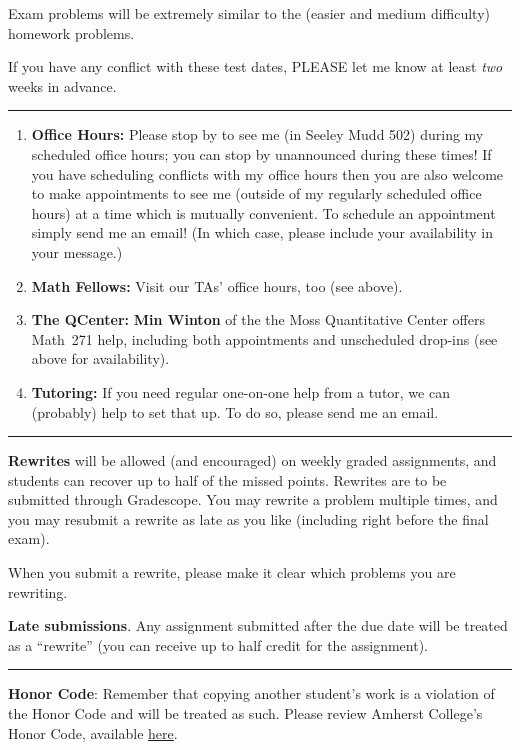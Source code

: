 \documentclass[12pt]{article}
\begin{document}
\noindent Exam problems will be extremely similar to the (easier and medium difficulty) homework problems.
\smallskip

\noindent If you have any conflict with these test dates, PLEASE let me know at least \emph{two} weeks in advance.

\medskip \hrule \medskip

\begin{enumerate}
\item[]{\bf Office Hours:}
 Please stop by to see me (in Seeley Mudd 502) during my scheduled office hours; you can stop by unannounced during these times! If you have scheduling conflicts with my office hours then you are also welcome to make appointments to see me (outside of my regularly scheduled office hours) at a time which is mutually convenient. To schedule an appointment simply send me an email! (In which case, please include your availability in your message.)

\item[] {\bf Math Fellows:} Visit our TAs' office hours, too (see above).
\item[] {\bf The QCenter:} \textbf{Min Winton} of the the Moss Quantitative Center offers Math~271 help, including both appointments and unscheduled drop-ins (see above for availability).
\item[] {\bf Tutoring:} If you need regular one-on-one help from a tutor, we can (probably) help to set that up. To do so, please send me an email.
\end{enumerate}

\medskip \hrule \medskip

\noindent\textbf{Rewrites} will be allowed (and encouraged) on weekly graded assignments, and students can recover up to half of the missed points. Rewrites are to be submitted through Gradescope. You may rewrite a problem multiple times, and you may resubmit a rewrite as late as you like (including right before the final exam).
\medskip

\noindent When you submit a rewrite, please make it clear which problems you are rewriting.

\bigskip
\noindent\textbf{Late submissions}. Any assignment submitted after the due date will be treated as a ``rewrite'' (you can receive up to half credit for the assignment).

\medskip \hrule \medskip

\noindent\textbf{Honor Code}: Remember that copying another student's work is a violation of the Honor Code and will be treated as such. Please review Amherst College's Honor Code, available \href{https://www.amherst.edu/offices/student-affairs/community-standards/college-standards/honor-code}{here}.
\end{document}
